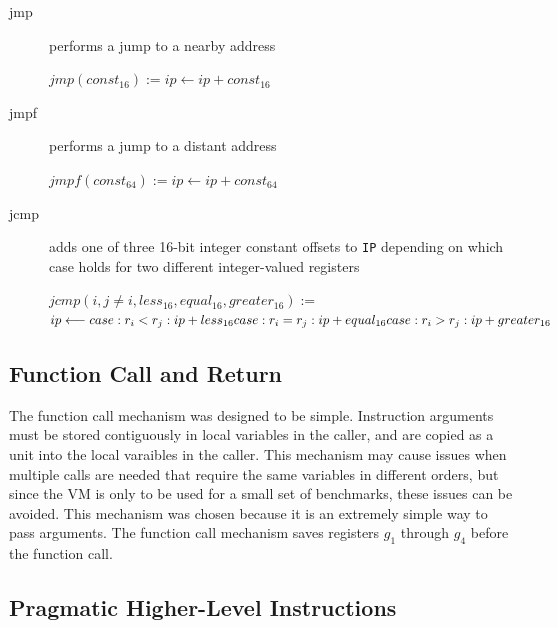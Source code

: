 \documentclass[english,a4paper,12pt]{report}
\begin{document}
\begin{description}
	\item[jmp] performs a jump to a nearby address
	
	$jmp(const_{16}) := ip \longleftarrow ip + const_{16}$ \\
	\item[jmpf] performs a jump to a distant address
	
	$jmpf(const_{64}) := ip \longleftarrow ip + const_{64}$ \\	
	
	\item[jcmp] adds one of three 16-bit integer constant offsets to
	\verb|IP| depending on which case holds for two different
	integer-valued registers
	
	$jcmp(i, j\neq i,less_{16},equal_{16},greater_{16}) :=$ \\
	$ ip \longleftarrow  \\
	case :r_{i} < r_{j}: ip + less_{16}   \\
	case :r_{i} = r_{j}: ip + equal_{16} \\
	case :r_{i} > r_{j}: ip + greater_{16}$ \\
\end{description}


\subsection{Function Call and Return}

The function call mechanism was designed to be simple. Instruction
arguments must be stored contiguously in local variables in the
caller, and are copied as a unit into the local varaibles in the
caller. This mechanism may cause issues when multiple calls are needed
that require the same variables in different orders, but since the VM
is only to be used for a small set of benchmarks, these issues can be
avoided. This mechanism was chosen because it is an extremely simple
way to pass arguments. The function call mechanism saves registers
$g_1$ through $g_4$ before the function call.

\subsection{Pragmatic Higher-Level Instructions}
\end{document}
